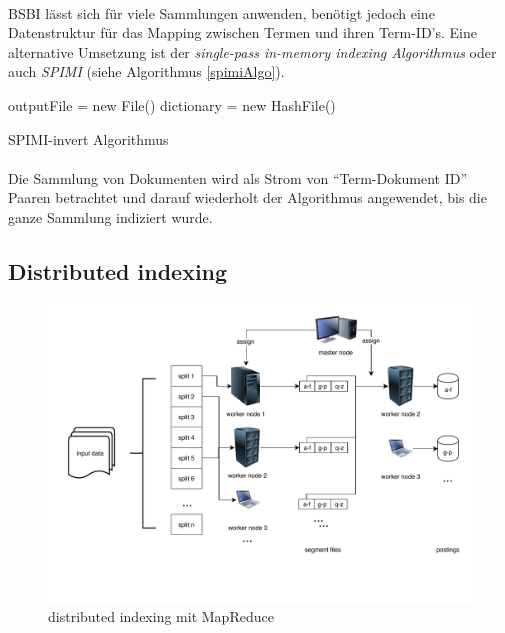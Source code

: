 \paragraph{}
BSBI lässt sich für viele Sammlungen anwenden, benötigt jedoch eine Datenstruktur für das Mapping zwischen Termen und ihren Term-ID's. Eine alternative Umsetzung ist der \textit{single-pass in-memory indexing Algorithmus} oder auch \textit{SPIMI} (siehe Algorithmus \ref{spimiAlgo}).\par
\begin{algorithm}
 outputFile = new File()\;
 dictionary = new HashFile()\;
  \caption{SPIMI-invert Algorithmus} \label{spimiAlgo}
\end{algorithm}

\paragraph{}
 Die Sammlung von Dokumenten wird als Strom von \enquote{Term-Dokument ID} Paaren betrachtet und darauf wiederholt der Algorithmus angewendet, bis die ganze Sammlung indiziert wurde.


\subsection{Distributed indexing}
\begin{figure}[hb]
  \includegraphics[width=\textwidth,height=0.4\textheight]{pdf/distributedIndexAll.pdf}
  \caption{distributed indexing mit MapReduce}
  \label{distribIndex}
\end{figure}
